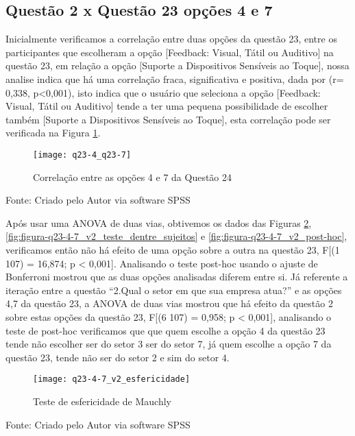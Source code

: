 \subsection{Questão 2 x Questão 23 opções 4 e 7}

Inicialmente verificamos a correlação entre duas opções da questão 23, entre os participantes que escolheram a opção [Feedback: Visual, Tátil ou Auditivo] na questão 23, em relação a opção [Suporte a Dispositivos Sensíveis ao Toque], nossa analise indica que há uma correlação fraca, significativa e positiva, dada por (r= 0,338, p<0,001), isto indica que o usuário que seleciona a opção [Feedback: Visual, Tátil ou Auditivo] tende a ter uma pequena possibilidade de escolher também [Suporte a Dispositivos Sensíveis ao Toque], esta correlação pode ser verificada na Figura \ref{fig:figura-q23-4_q23-7}.

\begin{figure}[H]
	\centering	
	\caption{Correlação entre as opções 4 e 7 da Questão 24}
	\texttt{[image: q23-4\_q23-7]}
	\label{fig:figura-q23-4_q23-7}
\end{figure}
\vspace{-0.8 cm} \hspace{1.35 cm} Fonte: Criado pelo Autor via software SPSS\newline

Após usar uma ANOVA de duas vias, obtivemos os dados das Figuras \ref{fig:figura-q23-4-7_v2_esfericidade}, \ref{fig:figura-q23-4-7_v2_teste_dentre_sujeitos} e \ref{fig:figura-q23-4-7_v2_post-hoc}, verificamos então  não há efeito de uma opção sobre a outra na questão 23, F[(1 107) = 16,874; p < 0,001]. Analisando o teste post-hoc usando o ajuste de Bonferroni mostrou que  as duas opções analisadas diferem entre si.\newline
\indent Já referente a iteração entre a questão “2.Qual o setor em que sua  empresa atua?” e as opções 4,7 da questão 23, a ANOVA de duas vias mostrou que há efeito da questão 2 sobre estas opções da questão 23, F[(6 107) = 0,958; p < 0,001], analisando o teste de post-hoc verificamos que que quem escolhe a  opção 4 da questão 23 tende não escolher ser do setor 3 ser do setor 7, já quem escolhe a  opção 7 da questão 23, tende não ser do setor 2 e sim do setor 4.

\begin{figure}[H]
	\centering	
	\caption{Teste de esfericidade de Mauchly}
	\texttt{[image: q23-4-7\_v2\_esfericidade]}
	\label{fig:figura-q23-4-7_v2_esfericidade}
\end{figure}
\vspace{-0.8 cm} \hspace{1.55 cm} Fonte: Criado pelo Autor via software SPSS

